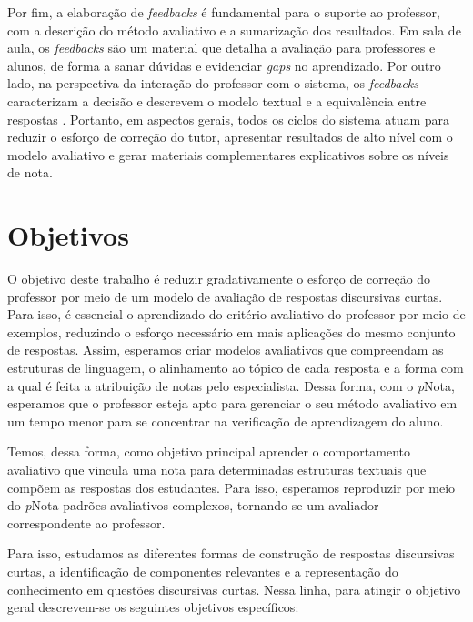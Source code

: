 Por fim, a elaboração de \textit{feedbacks} é fundamental para o suporte ao professor, com a descrição do método avaliativo e a sumarização dos resultados. Em sala de aula, os \textit{feedbacks} são um material que detalha a avaliação para professores e alunos, de forma a sanar dúvidas e evidenciar \textit{gaps} no aprendizado. Por outro lado, na perspectiva da interação do professor com o sistema, os \textit{feedbacks} caracterizam a decisão e descrevem o modelo textual e a equivalência entre respostas \cite{bernius2022}. Portanto, em aspectos gerais, todos os ciclos do sistema atuam para reduzir o esforço de correção do tutor, apresentar resultados de alto nível com o modelo avaliativo e gerar materiais complementares explicativos sobre os níveis de nota.

\section{Objetivos} \label{cap1-objetivos}

O objetivo deste trabalho é reduzir gradativamente o esforço de correção do professor por meio de um modelo de avaliação de respostas discursivas curtas. Para isso, é essencial o aprendizado do critério avaliativo do professor por meio de exemplos, reduzindo o esforço necessário em mais aplicações do mesmo conjunto de respostas. Assim, esperamos criar modelos avaliativos que compreendam as estruturas de linguagem, o alinhamento ao tópico de cada resposta e a forma com a qual é feita a atribuição de notas pelo especialista. Dessa forma, com o \textit{p}Nota, esperamos que o professor esteja apto para gerenciar o seu método avaliativo em um tempo menor para se concentrar na verificação de aprendizagem do aluno.

Temos, dessa forma, como objetivo principal aprender o comportamento avaliativo que vincula uma nota para determinadas estruturas textuais que compõem as respostas dos estudantes. Para isso, esperamos reproduzir por meio do \textit{p}Nota padrões avaliativos complexos, tornando-se um avaliador correspondente ao professor.

Para isso, estudamos as diferentes formas de construção de respostas discursivas curtas, a identificação de componentes relevantes e a representação do conhecimento em questões discursivas curtas. Nessa linha, para atingir o objetivo geral descrevem-se os seguintes objetivos específicos:

